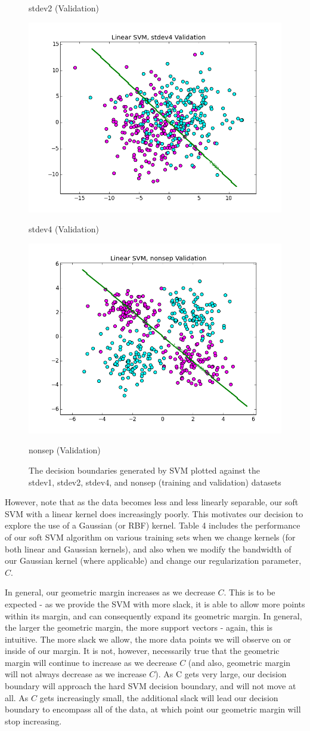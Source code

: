 \documentclass[10pt]{article}
\begin{document}
\begin{figure}[ht]
\begin{minipage}[b]{.24\linewidth}
		\caption*{stdev2 (Validation)}
	\end{minipage}
	\begin{minipage}[b]{.24\linewidth}
		\centering
		\includegraphics[width=.5\linewidth, height=.5in]{linear_svm_stdev4_validation.png}
		\caption*{stdev4 (Validation)}
	\end{minipage}
	\begin{minipage}[b]{.24\linewidth}
		\centering
		\includegraphics[width=.5\linewidth, height=.5in]{linear_svm_nonsep_validation.png}
		\caption*{nonsep (Validation)}
	\end{minipage}
	\caption{The decision boundaries generated by SVM plotted against the stdev1, stdev2, stdev4, and nonsep (training and validation) datasets}
\end{figure}

However, note that as the data becomes less and less linearly separable, our soft SVM with a linear kernel does increasingly poorly. This motivates our decision to explore the use of a Gaussian (or RBF) kernel. Table 4 includes the performance of our soft SVM algorithm on various training sets when we change kernels (for both linear and Gaussian kernels), and also when we modify the bandwidth of our Gaussian kernel (where applicable) and change our regularization parameter, $C$. 

In general, our geometric margin increases as we decrease $C$. This is to be expected - as we provide the SVM with more slack, it is able to allow more points within its margin, and can consequently expand its geometric margin. In general, the larger the geometric margin, the more support vectors - again, this is intuitive. The more slack we allow, the more data points we will observe on or inside of our margin. It is not, however, necessarily true that the geometric margin will continue to increase as we decrease $C$ (and also, geometric margin will not always decrease as we increase $C$). As C gets very large, our decision boundary will approach the hard SVM decision boundary, and will not move at all. As $C$ gets increasingly small, the additional slack will lead our decision boundary to encompass all of the data, at which point our geometric margin will stop increasing.
\end{document}
